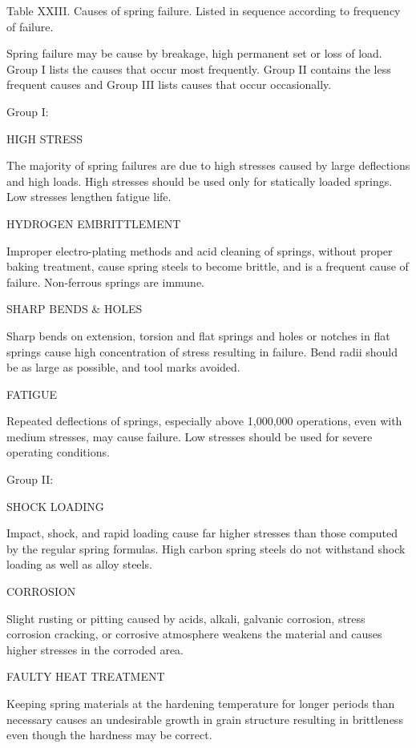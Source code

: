 \documentclass[10pt]{article}
\begin{document}
\clearpage

Table XXIII. Causes of spring failure. Listed in sequence according to frequency of failure.


Spring failure may be cause by breakage, high permanent set or loss of load.
Group I lists the causes that occur most frequently.
Group II contains the less frequent causes and Group III lists causes that occur occasionally.


Group I:

HIGH STRESS

The majority of spring failures are due to high stresses caused by large deflections and high loads. 
High stresses should be used only for statically loaded springs. 
Low stresses lengthen fatigue life.

HYDROGEN EMBRITTLEMENT

Improper electro-plating methods and acid cleaning of springs, without proper baking treatment, cause spring steels to become brittle, and is a frequent cause of failure. 
Non-ferrous springs are immune.

SHARP BENDS \& HOLES

Sharp bends on extension, torsion and flat springs and holes or notches in flat springs cause high concentration of stress resulting in failure. 
Bend radii should be as large as possible, and tool marks avoided.

FATIGUE

Repeated deflections of springs, especially above 1,000,000 operations, even with medium stresses, may cause failure. 
Low stresses should be used for severe operating conditions.

Group II:

SHOCK LOADING

Impact, shock, and rapid loading cause far higher stresses than those computed by the regular spring formulas. 
High carbon spring steels do not withstand shock loading as well as alloy steels.

CORROSION

Slight rusting or pitting caused by acids, alkali, galvanic corrosion, stress corrosion cracking, or corrosive atmosphere weakens the material and causes higher stresses in the corroded area.

FAULTY HEAT TREATMENT

Keeping spring materials at the hardening temperature for longer periods than necessary causes an undesirable growth in grain structure resulting in brittleness even though the hardness may be correct.
\end{document}
